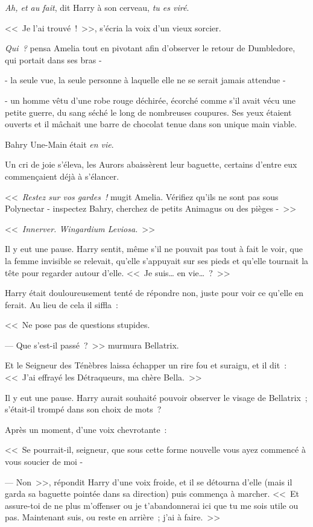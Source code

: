 \emph{Ah, et au fait}, dit Harry à son cerveau, \emph{tu es viré}.

\later

<<~Je l'ai trouvé~!~>>, s'écria la voix d'un vieux sorcier.

\emph{Qui~?} pensa Amelia tout en pivotant afin d'observer le retour de Dumbledore, qui portait dans ses bras -

- la seule vue, la seule personne à laquelle elle ne se serait jamais attendue -

- un homme vêtu d'une robe rouge déchirée, écorché comme s'il avait vécu une petite guerre, du sang séché le long de nombreuses coupures. Ses yeux étaient ouverts et il mâchait une barre de chocolat tenue dans son unique main viable.

Bahry Une-Main était \emph{en vie}.

Un cri de joie s'éleva, les Aurors abaissèrent leur baguette, certains d'entre eux commençaient déjà à s'élancer.

<<~\emph{Restez sur vos gardes~!} mugit Amelia. Vérifiez qu'ils ne sont pas sous Polynectar - inspectez Bahry, cherchez de petits Animagus ou des pièges -~>>

\later

<<~\emph{Innerver. Wingardium Leviosa.}~>>

Il y eut une pause. Harry sentit, même s'il ne pouvait pas tout à fait le voir, que la femme invisible se relevait, qu'elle s'appuyait sur ses pieds et qu'elle tournait la tête pour regarder autour d'elle. <<~Je suis… en vie…~?~>>

Harry était douloureusement tenté de répondre non, juste pour voir ce qu'elle en ferait. Au lieu de cela il siffla~:

<<~Ne pose pas de questions stupides.

--- Que s'est-il passé~?~>> murmura Bellatrix.

Et le Seigneur des Ténèbres laissa échapper un rire fou et suraigu, et il dit~: <<~J'ai effrayé les Détraqueurs, ma chère Bella.~>>

Il y eut une pause. Harry aurait souhaité pouvoir observer le visage de Bellatrix~; s'était-il trompé dans son choix de mots~?

Après un moment, d'une voix chevrotante~:

<<~Se pourrait-il, seigneur, que sous cette forme nouvelle vous ayez commencé à vous soucier de moi -

--- Non~>>, répondit Harry d'une voix froide, et il se détourna d'elle (mais il garda sa baguette pointée dans sa direction) puis commença à marcher. <<~Et assure-toi de ne plus m'offenser ou je t'abandonnerai ici que tu me sois utile ou pas. Maintenant suis, ou reste en arrière~; j'ai à faire.~>>

